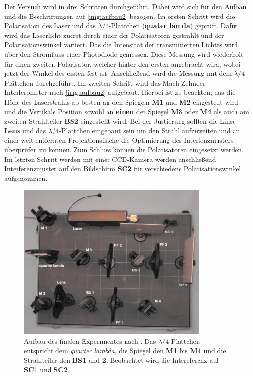 \documentclass[numbers=noenddot,a4paper,notitlepage,twoside,BCOR15mm]{scrartcl}
\newcommand{\tilt}[1]{\textit{#1}}
\newcommand{\fett}[1]{\textbf{#1}}
\begin{document}
	Der Versuch wird in drei Schritten durchgeführt. Dabei wird sich für den Aufbau und die Beschriftungen auf \autoref{img:aufbau2} bezogen. Im ersten Schritt wird die Polarisation des Laser und das $\lambda /4$-Plättchen (\textbf{quater lamda}) geprüft. Dafür wird das Laserlicht zuerst durch einer der Polarisatoren gestrahlt und der Polarisationswinkel variiert. Das die Intensität der transmitierten Lichtes wird über den Stromfluss einer Photodiode gemessen. Diese Messung wird wiederholt für einen zweiten Polarisator, welcher hinter den ersten angebracht wird, wobei jetzt der Winkel des ersten fest ist. Anschließend wird die Messung mit dem $\lambda/4$-Plättchen durchgeführt. Im zweiten Schritt wird das Mach-Zehnder-Interferometer nach \autoref{img:aufbau2} aufgebaut. Hierbei ist zu beachten, das die Höhe des Laserstrahls ab besten an den Spiegeln \textbf{M1} und \textbf{M2} eingestellt wird und die Vertikale Position sowohl an \textbf{einen} der Spiegel \textbf{M3} oder \textbf{M4} als auch am zweiten Strahlteiler \textbf{BS2} eingestellt wird. Bei der Justierung sollten die Linse \textbf{Lens} und das $\lambda/4$-Plättchen eingebaut sein um den Strahl aufzuweiten und an einer weit entfernten Projektionsfläche die Optimierung des Interfenzmusters überprüfen zu können. Zum Schluss können die Polarisatoren eingesetzt werden. Im letzten Schritt werden mit einer CCD-Kamera werden anschließend Interferenzmuster auf den Bildschirm \textbf{SC2} für verschiedene Polarisationswinkel aufgenommen.
	
	\begin{figure}[H]
		\centering
		\includegraphics[width=0.85\textwidth]{pics/aufbau.png}
		\caption{Aufbau des finalen Experimentes nach \cite{MZaufbau}. Das $\lambda/4$-Plättchen entspricht dem \tilt{quarter lambda}, die Spiegel den \fett{M1} bis \fett{M4} und die Strahlteiler den \fett{BS1} und \fett{2}. Beobachtet wird die Intereferenz auf \fett{SC1} und \fett{SC2}.}
		\label{img:aufbau2}
	\end{figure}
	
\end{document}
